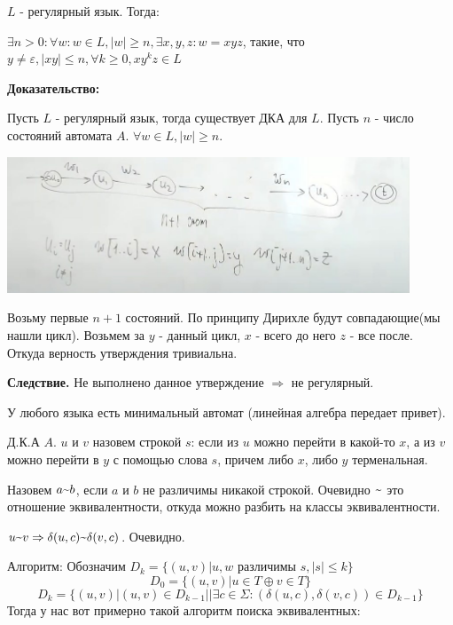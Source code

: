
$L$ - регулярный язык. Тогда:

$\exists n > 0: \forall w:w \in L, |w|\geq n , \exists x,y,z : w =xyz$, такие, что $y \neq \varepsilon, |xy|\leq n, \forall k\geq 0, xy^kz\in L$

\textbf{Доказательство:}

Пусть $L$ - регулярный язык, тогда существует ДКА для $L$. Пусть $n$ - число состояний автомата $A$. $\forall w \in L, |w| \geq n$.

\begin{center}
    \includegraphics[width = 12cm]{assets/9_2_1.jpg}
\end{center}

Возьму первые $n+1$ состояний. По принципу Дирихле будут совпадающие(мы нашли цикл). Возьмем за $y$ - данный цикл, $x$ - всего до него $z$ - все после. Откуда верность утверждения тривиальна.

\textbf{Следствие.} Не выполнено данное утверждение $\Rightarrow$ не регулярный.

У любого языка есть минимальный автомат (линейная алгебра передает привет).


Д.К.А $A$. $u$ и $v$ назовем  строкой $s$: если из $u$ можно перейти в какой-то $x$, а из $v$ можно перейти в $y$ с помощью слова $s$, причем либо $x$, либо $y$ терменальная.

Назовем $a \mytilde b$,  если $a$ и $b$ не различимы никакой строкой. Очевидно $\mytilde$ это отношение эквивалентности, откуда можно разбить на классы эквивалентности.

 $u \mytilde v \Rightarrow \delta(u,c) \mytilde \delta(v,c)$. Очевидно.

Алгоритм: Обозначим $D_k = \{(u,v) | u,w \text{ различимы } s,|s|\leq k\}$
$$D_0 = \{(u,v) | u\in T \oplus v \in T \}$$
$$D_k = \{(u,v) | (u,v) \in D_{k-1} ||\exists c \in \Sigma:(\delta(u,c),\delta(v,c))\in D_{k-1}\}$$
Тогда у нас вот примерно такой алгоритм поиска  эквивалентных:

